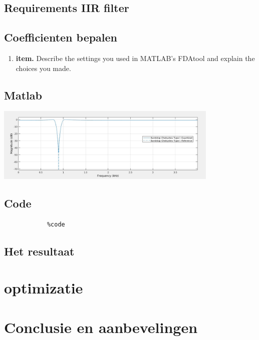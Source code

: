 \documentclass[11pt,a4paper]{article}
\newcommand\litem[1]{\item{\bfseries#1.\space}}
\begin{document}
		\subsection{Requirements IIR filter}
	
		\subsection{Coefficienten bepalen}
	
		\begin{enumerate}[label=\emph{\alph*)}]
			\litem{item} Describe the settings you 					used in MATLAB’s FDAtool and explain the 					choices you made.
		\end{enumerate}
	
		\subsection{Matlab}
	
		\includegraphics[width=0.80\textwidth]{iirMatlab}\par\vspace{1cm}		
		
		\subsection{Code}

		\begin{lstlisting}
			%code
		\end{lstlisting}
		
		\subsection{Het resultaat}	
	
	\section{optimizatie}
	

	\section{Conclusie en aanbevelingen}	
\end{document}
